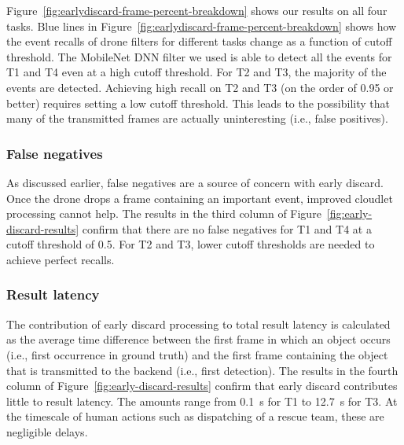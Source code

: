 Figure~\ref{fig:earlydiscard-frame-percent-breakdown} shows our results on all
four tasks. Blue lines in Figure~\ref{fig:earlydiscard-frame-percent-breakdown}
shows how the event recalls of drone filters for different tasks change as a
function of cutoff threshold. The MobileNet DNN filter we used is able to detect
all the events for T1 and T4 even at a high cutoff threshold. For T2 and T3, the
majority of the events are detected. Achieving high recall on T2 and T3 (on the
order of 0.95 or better) requires setting a low cutoff threshold.  This leads to
the possibility that many of the transmitted frames are actually uninteresting
(i.e., false positives).

\subsubsection{False negatives}
As discussed earlier, false negatives are
a source of concern with early discard.  Once the drone drops a frame
containing an important event, improved cloudlet processing cannot help. The
results in the third column of Figure~\ref{fig:early-discard-results} confirm
that there are no false negatives for T1 and T4 at a cutoff threshold of 0.5.
For T2 and T3, lower cutoff thresholds are needed to achieve perfect recalls.

\subsubsection{Result latency}
The contribution of early discard processing to total result latency
is calculated as the average time difference between the first frame
in which an object occurs (i.e., first occurrence in ground truth) and
the first frame containing the object that is transmitted to the
backend (i.e., first detection).  The results in the fourth column of
Figure~\ref{fig:early-discard-results} confirm that early discard
contributes little to result latency.  The amounts range from 0.1~s
for T1 to 12.7~s for T3.  At the timescale of human actions
such as dispatching of a rescue team, these are negligible delays.

